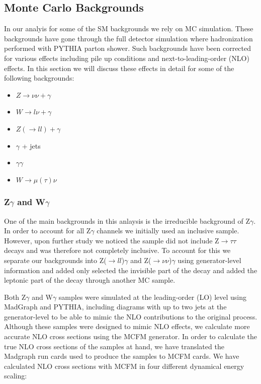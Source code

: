 \subsection{Monte Carlo Backgrounds}
\label{sec:mcbackgrounds}

In our analyis for some of the SM backgrounds we rely on MC simulation. These backgrounds have gone through the full detector simulation where hadronization performed with PYTHIA parton shower. Such backgrounds have been corrected for various effects including pile up conditions and next-to-leading-order (NLO) effects. In this section we will discuss these effects in detail for some of the following backgrounds:

\begin{itemize}
\item $Z\rightarrow \nu\nu +\gamma$
\item $W\rightarrow l\nu + \gamma$
\item $Z(\rightarrow ll)+\gamma$
\item $\gamma$ + jets
\item $\gamma \gamma$
\item $W\rightarrow \mu (\tau) \nu$
\end{itemize}


\subsubsection{Z$\gamma$ and W$\gamma$}

One of the main backgrounds in this anlaysis is the irreducible background of Z$\gamma$. In order to account for all Z$\gamma$ channels we initially used an inclusive sample. However, upon further study we noticed the sample did not include Z$\to \tau\tau$ decays and was therefore not completely inclusive. To account for this we separate our backgrounds into Z($\to ll$)$\gamma$ and Z($\to \nu\nu$)$\gamma$ using generator-level information and added only selected the invisible part of the decay and added the leptonic part of the decay through another MC sample.

Both Z$\gamma$ and W$\gamma$ samples were simulated at the leading-order (LO) level using MadGraph and PYTHIA, including diagrams with up to two jets at the generator-level to be able to mimic the NLO contributions to the original process. 
Although these samples were designed to mimic NLO effects, we calculate more accurate NLO cross sections using the MCFM generator. In order to calculate the true NLO cross sections of the samples at hand, we have translated the Madgraph run cards used to produce the samples to MCFM cards. We have calculated NLO cross sections with MCFM in four different dynamical energy scaling: 

